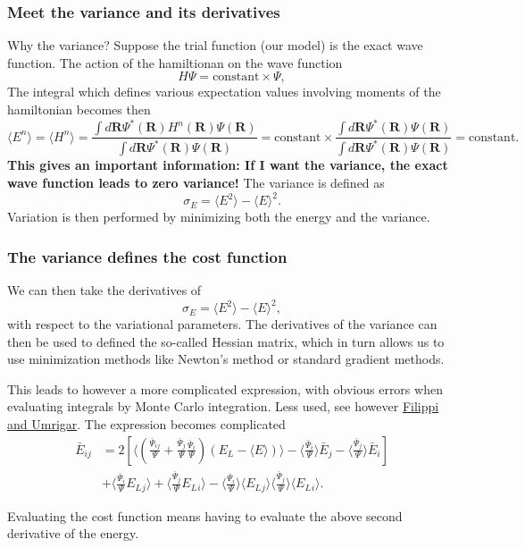 \documentclass{beamer}
\begin{document}
\begin{frame}
\frametitle{Meet the variance and its derivatives}

\begin{block}{Why the variance? }
Suppose the trial function (our model) is the exact wave function. The action of the hamiltionan
on the wave function
\[
   H\Psi = \mathrm{constant}\times \Psi,
\]
The integral which defines various 
expectation values involving moments of the hamiltonian becomes then
\[
   \langle E^n \rangle =   \langle H^n \rangle =
   \frac{\int d\bm{R}\Psi^{\ast}(\bm{R})H^n(\bm{R})\Psi(\bm{R})}
        {\int d\bm{R}\Psi^{\ast}(\bm{R})\Psi(\bm{R})}=
\mathrm{constant}\times\frac{\int d\bm{R}\Psi^{\ast}(\bm{R})\Psi(\bm{R})}
        {\int d\bm{R}\Psi^{\ast}(\bm{R})\Psi(\bm{R})}=\mathrm{constant}.
\]
\textbf{This gives an important information: If I want the variance, the exact wave function leads to zero variance!}
The variance is defined as 
\[
\sigma_E = \langle E^2\rangle - \langle E\rangle^2.
\]
Variation is then performed by minimizing both the energy and the variance.

\end{block}
\end{frame}

\begin{frame}
\frametitle{The variance defines the cost function}

\begin{block}{}
We can then take the derivatives of 
\[
\sigma_E = \langle E^2\rangle - \langle E\rangle^2,
\]
with respect to the variational parameters. The derivatives of the variance can then be used to defined the
so-called Hessian matrix, which in turn allows us to use minimization methods like Newton's method or 
standard gradient methods. 

This leads to however a more complicated expression, with obvious errors when evaluating integrals by Monte Carlo integration. Less used, see however \href{{https://journals.aps.org/prl/abstract/10.1103/PhysRevLett.94.150201}}{Filippi and Umrigar}. The expression becomes complicated
\begin{align}
\bar{E}_{ij} &= 2\left[ \langle (\frac{\bar{\Psi}_{ij}}{\Psi}+\frac{\bar{\Psi}_{j}}{\Psi}\frac{\bar{\Psi}_{i}}{\Psi})(E_L-\langle E\rangle)\rangle -\langle \frac{\bar{\Psi}_{i}}{\Psi}\rangle\bar{E}_j-\langle \frac{\bar{\Psi}_{j}}{\Psi}\rangle\bar{E}_i\right] \\ \nonumber
&+\langle \frac{\bar{\Psi}_{i}}{\Psi}E_L{_j}\rangle +\langle \frac{\bar{\Psi}_{j}}{\Psi}E_L{_i}\rangle -\langle \frac{\bar{\Psi}_{i}}{\Psi}\rangle\langle E_L{_j}\rangle \langle \frac{\bar{\Psi}_{j}}{\Psi}\rangle\langle E_L{_i}\rangle.  
\end{align}

Evaluating the cost function means having to evaluate the above second derivative of the energy. 

\end{block}
\end{frame}
\end{document}
